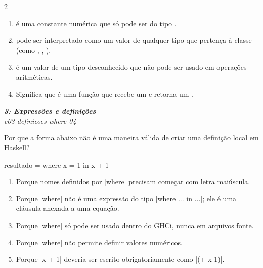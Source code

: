\documentclass[a4paper,10pt,brazil]{article}
\begin{document}
\begin{multicols}{2}
\begin{enumerate}
  \item {} é uma constante numérica que só pode ser do tipo .

  \item {} pode ser interpretado como um valor de qualquer tipo que pertença à classe  (como , , ).

  \item {} é um valor de um tipo desconhecido que não pode ser usado em operações aritméticas.

  \item Significa que  é uma função que recebe um  e retorna um .


\end{enumerate}

\begin{flushright}
  \footnotesize
  \textit{\textbf{3: Expressões e definições}}\\
  \textit{c03-definicoes-where-04}\\

\end{flushright}
Por que a forma abaixo não é uma maneira válida de criar uma definição local em Haskell?

\begin{haskellcode}
resultado = where x = 1 in x + 1
\end{haskellcode}

\begin{enumerate}
  \item Porque nomes definidos por \haskellinline|where| precisam começar com letra maiúscula.

  \item Porque \haskellinline|where| não é uma expressão do tipo \haskellinline|where ... in ...|; ele é uma cláusula anexada a uma equação.

  \item Porque \haskellinline|where| só pode ser usado dentro do GHCi, nunca em arquivos fonte.

  \item Porque \haskellinline|where| não permite definir valores numéricos.

  \item Porque \haskellinline|x + 1| deveria ser escrito obrigatoriamente como \haskellinline|(+ x 1)|.



\end{enumerate}
\end{multicols}
\end{document}

